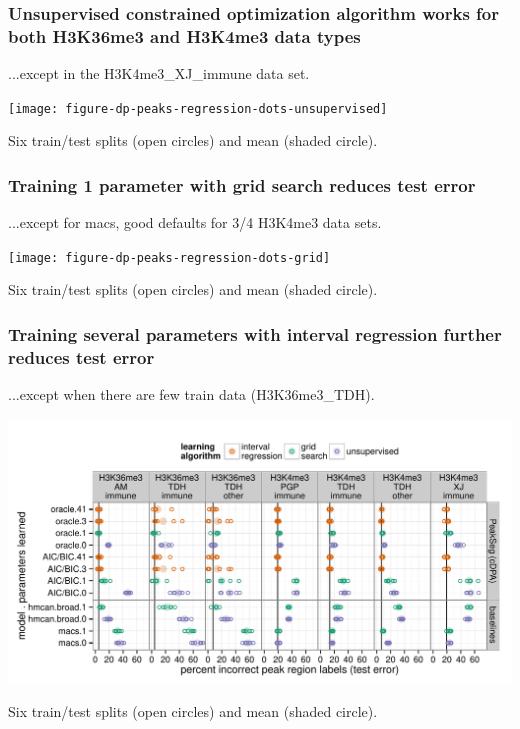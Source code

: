 \documentclass{beamer}
\begin{document}
\begin{frame}
  \frametitle{Unsupervised constrained optimization algorithm works
    for both H3K36me3 and H3K4me3 data types}

  ...except in the H3K4me3\_XJ\_immune data set.

  \texttt{[image: figure-dp-peaks-regression-dots-unsupervised]}
  
  Six train/test splits (open circles) and mean (shaded circle).
\end{frame}

\begin{frame}
  \frametitle{Training 1 parameter with grid search reduces test error}

  ...except for macs, good defaults for 3/4 H3K4me3 data sets.

  \texttt{[image: figure-dp-peaks-regression-dots-grid]}

  Six train/test splits (open circles) and mean (shaded circle).
\end{frame}

\begin{frame}
  \frametitle{Training several parameters with interval regression 
    further reduces test error}

  ...except when there are few train data (H3K36me3\_TDH).

  \includegraphics[width=\textwidth]{figure-dp-peaks-regression-dots}

  Six train/test splits (open circles) and mean (shaded circle).
\end{frame}
\end{document}
